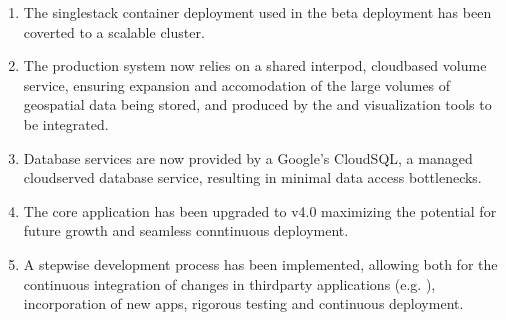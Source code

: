 \documentclass[letterpaper,12pt,english,openany,oneside]{sphinxmanual}
\begin{document}
\begin{enumerate}
%
\item {} 
\sphinxAtStartPar
The single\sphinxhyphen{}stack {\hyperref[\detokenize{_static/glossary:term-Docker}]{}} container deployment used in the beta deployment has been coverted to a scalable {\hyperref[\detokenize{_static/glossary:term-Kubernetes}]{}} cluster.

\item {} 
\sphinxAtStartPar
The production system now relies on a shared inter\sphinxhyphen{}pod, cloud\sphinxhyphen{}based {\hyperref[\detokenize{_static/glossary:term-NFS}]{}} volume service, ensuring expansion and accomodation of the large volumes of geospatial data being stored, and produced by the {\hyperref[\detokenize{_static/glossary:term-H-H}]{}} and visualization tools to be integrated.

\item {} 
\sphinxAtStartPar
Database services are now provided by a Google’s CloudSQL, a managed cloud\sphinxhyphen{}served database service, resulting in minimal data access bottle\sphinxhyphen{}necks.

\item {} 
\sphinxAtStartPar
The core {\hyperref[\detokenize{_static/glossary:term-0}]{}} application has been upgraded to v4.0 maximizing the potential for future growth and seamless conntinuous deployment.

\item {} 
\sphinxAtStartPar
A step\sphinxhyphen{}wise development process has been implemented, allowing both for the continuous integration of changes in third\sphinxhyphen{}party applications (e.g. {\hyperref[\detokenize{_static/glossary:term-0}]{}}), incorporation of new {\hyperref[\detokenize{_static/glossary:term-RGVFlood}]{}} apps, rigorous testing and continuous deployment.

\end{enumerate}

\appendix
{}\label{\detokenize{_static/glossary::doc}}
\end{document}
